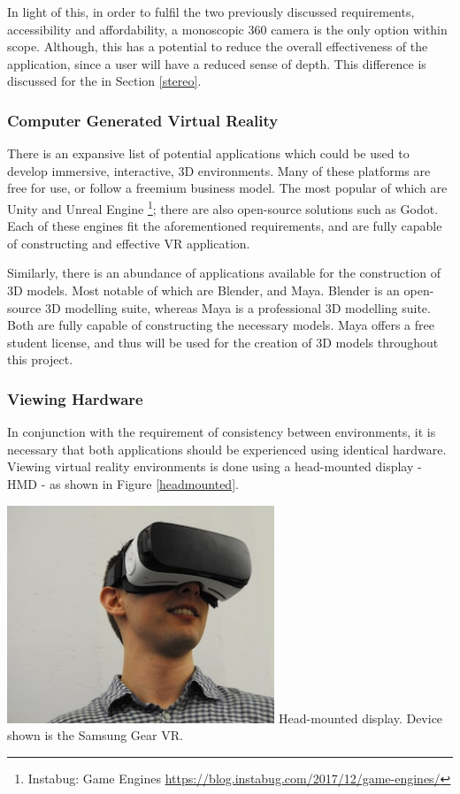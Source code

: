 \documentclass[ %
                    author={Elis Jones},
                supervisor={Dr. Kirsten Cater},
                    degree={BSc},
                     title={The Effect of Presentation Medium on Spatial Cognition},
                  subtitle={in the Virtual Environment},
                      year={2018} ]{dissertation}
\begin{document}
In light of this, in order to fulfil the two previously discussed requirements, accessibility and affordability, a monoscopic 360 camera is the only option within scope. Although, this has a potential to reduce the overall effectiveness of the application, since a user will have a reduced sense of depth. This difference is discussed for the in Section \ref{stereo}.

\subsubsection{Computer Generated Virtual Reality}
There is an expansive list of potential applications which could be used to develop immersive, interactive, 3D environments. Many of these platforms are free for use, or follow a freemium business model. The most popular of which are Unity and Unreal Engine \footnote{Instabug: Game Engines \url{https://blog.instabug.com/2017/12/game-engines/}}; there are also open-source solutions such as Godot. Each of these engines fit the aforementioned requirements, and are fully capable of constructing and effective VR application. 

Similarly, there is an abundance of applications available for the construction of 3D models. Most notable of which are Blender, and Maya. Blender is an open-source 3D modelling suite, whereas Maya is a professional 3D modelling suite. Both are fully capable of constructing the necessary models. Maya offers a free student license, and thus will be used for the creation of 3D models throughout this project.

\subsubsection{Viewing Hardware}
In conjunction with the requirement of consistency between environments, it is necessary that both applications should be experienced using identical hardware. Viewing virtual reality environments is done using a head-mounted display - HMD - as shown in Figure \ref{headmounted}.

\begin{minipage}{\textwidth}
\centering
\includegraphics[width=0.6\textwidth]{images/headmounted.jpg}
 {Head-mounted display. Device shown is the Samsung Gear VR.}
\label{headmounted}
\hfill \break
\end{minipage}
\end{document}
